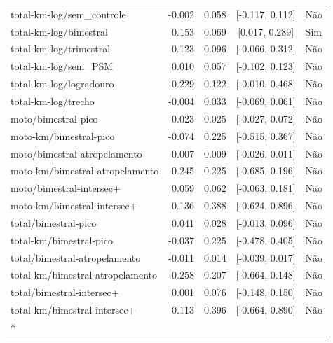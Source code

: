 \begin{longtable}{lrrcl}
total-km-log/sem\_controle & -0.002 & 0.058 & {}[-0.117, 0.112] & Não\\
total-km-log/bimestral & 0.153 & 0.069 & {}[0.017, 0.289] & Sim\\
total-km-log/trimestral & 0.123 & 0.096 & {}[-0.066, 0.312] & Não\\
total-km-log/sem\_PSM & 0.010 & 0.057 & {}[-0.102, 0.123] & Não\\
total-km-log/logradouro & 0.229 & 0.122 & {}[-0.010, 0.468] & Não\\
total-km-log/trecho & -0.004 & 0.033 & {}[-0.069, 0.061] & Não\\
moto/bimestral-pico & 0.023 & 0.025 & {}[-0.027, 0.072] & Não\\
moto-km/bimestral-pico & -0.074 & 0.225 & {}[-0.515, 0.367] & Não\\
moto/bimestral-atropelamento & -0.007 & 0.009 & {}[-0.026, 0.011] & Não\\
moto-km/bimestral-atropelamento & -0.245 & 0.225 & {}[-0.685, 0.196] & Não\\
moto/bimestral-intersec+ & 0.059 & 0.062 & {}[-0.063, 0.181] & Não\\
moto-km/bimestral-intersec+ & 0.136 & 0.388 & {}[-0.624, 0.896] & Não\\
total/bimestral-pico & 0.041 & 0.028 & {}[-0.013, 0.096] & Não\\
total-km/bimestral-pico & -0.037 & 0.225 & {}[-0.478, 0.405] & Não\\
total/bimestral-atropelamento & -0.011 & 0.014 & {}[-0.039, 0.017] & Não\\
total-km/bimestral-atropelamento & -0.258 & 0.207 & {}[-0.664, 0.148] & Não\\
total/bimestral-intersec+ & 0.001 & 0.076 & {}[-0.148, 0.150] & Não\\
total-km/bimestral-intersec+ & 0.113 & 0.396 & {}[-0.664, 0.890] & Não\\*
\end{longtable}
